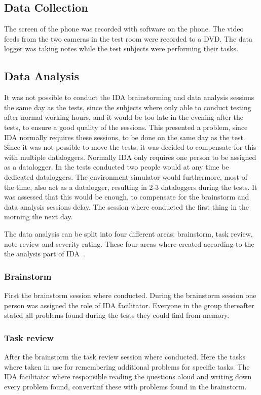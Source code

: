 \subsection{Data Collection}
The screen of the phone was recorded with software on the phone. The
video feeds from the two cameras in the test room were recorded to a
DVD. The data logger was taking notes while the test subjects were
performing their tasks.

\subsection{Data Analysis}
It was not possible to conduct the IDA brainstorming and data analysis sessions the same day as the tests, since the subjects where only able to conduct testing after normal working hours, and it would be too late in the evening after the tests, to ensure a good quality of the sessions. This presented a problem, since IDA normally requires these sessions, to be done on the same day as the test. Since it was not possible to move the tests, it was decided to compensate for this with multiple dataloggers. Normally IDA only requires one person to be assigned as a datalogger. In the tests conducted two people would at any time be dedicated dataloggers. The environment simulator would furthermore, most of the time, also act as a datalogger, resulting in 2-3 dataloggers during the tests. It was assessed that this would be enough, to compensate for the brainstorm and data analysis sessions delay. The session where conducted the first thing in the morning the next day. 

The data analysis can be split into four different areas; brainstorm, task review, note review and severity rating. These four areas where created according to the the analysis part of IDA~\cite{Kjeldskov2004}.

\subsubsection{Brainstorm}
First the brainstorm session where conducted. During the brainstorm session one person was assigned the role of IDA facilitator. Everyone in the group thereafter stated all problems found during the tests they could find from memory.

\subsubsection{Task review}
After the brainstorm the task review session where conducted. Here the tasks where taken in use for remembering additional problems for specific tasks. The IDA facilitator where responsible reading the questions aloud and writing down every problem found, convertinf these with problems found in the brainstorm.

